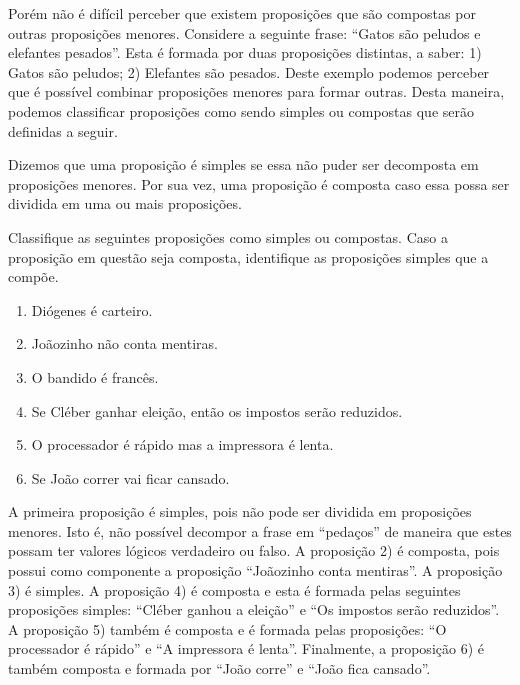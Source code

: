 Por\'em n\~ao \'e dif\'icil perceber que existem proposi\c{c}\~oes que s\~ao compostas por outras proposi\c{c}\~oes menores. Considere a
seguinte frase: ``Gatos s\~ao peludos e elefantes pesados''. Esta \'e formada por duas proposi\c{c}\~oes distintas, a saber: 1) Gatos s\~ao peludos;
2) Elefantes s\~ao pesados. Deste exemplo podemos perceber que \'e poss\'ivel combinar proposi\c{c}\~oes menores para formar outras. Desta maneira,
podemos classificar proposi\c{c}\~oes como sendo simples ou compostas que ser\~ao definidas a seguir.

\begin{Definition}
   Dizemos que uma proposi\c{c}\~ao \'e simples se essa n\~ao puder
   ser decomposta em proposi\c{c}\~oes menores. Por sua vez, uma
   proposi\c{c}\~ao \'e composta caso
   essa possa ser dividida em uma ou mais proposi\c{c}\~oes.
\end{Definition}
\begin{Example}
  Classifique as seguintes proposi\c{c}\~oes como simples ou compostas. Caso a proposi\c{c}\~ao em quest\~ao seja composta, identifique
  as proposi\c{c}\~oes simples que a comp\~oe.
  \begin{enumerate}
    \item Di\'ogenes \'e carteiro.
    \item Jo\~aozinho n\~ao conta mentiras.
    \item O bandido \'e franc\^es.
    \item Se Cl\'eber ganhar elei\c{c}\~ao, ent\~ao os impostos ser\~ao reduzidos.
    \item O processador \'e r\'apido mas a impressora \'e lenta.
    \item Se Jo\~ao correr vai ficar cansado.
  \end{enumerate}
  A primeira proposi\c{c}\~ao \'e simples, pois n\~ao pode ser dividida em proposi\c{c}\~oes menores. Isto \'e, n\~ao poss\'ivel decompor a frase
  em ``peda\c{c}os'' de maneira que estes possam ter valores l\'ogicos verdadeiro ou falso. A proposi\c{c}\~ao 2) \'e composta, pois possui como
  componente a proposi\c{c}\~ao ``Jo\~aozinho conta mentiras''. A proposi\c{c}\~ao 3) \'e simples. A proposi\c{c}\~ao 4) \'e composta e esta \'e
  formada pelas seguintes proposi\c{c}\~oes simples: ``Cl\'eber ganhou a elei\c{c}\~ao'' e ``Os impostos ser\~ao reduzidos''. A proposi\c{c}\~ao 5)
  tamb\'em \'e composta e \'e formada pelas proposi\c{c}\~oes: ``O processador \'e r\'apido'' e ``A impressora \'e lenta''. Finalmente, a
  proposi\c{c}\~ao 6) \'e tamb\'em composta e formada por ``Jo\~ao corre'' e ``Jo\~ao fica cansado''.
\end{Example}

